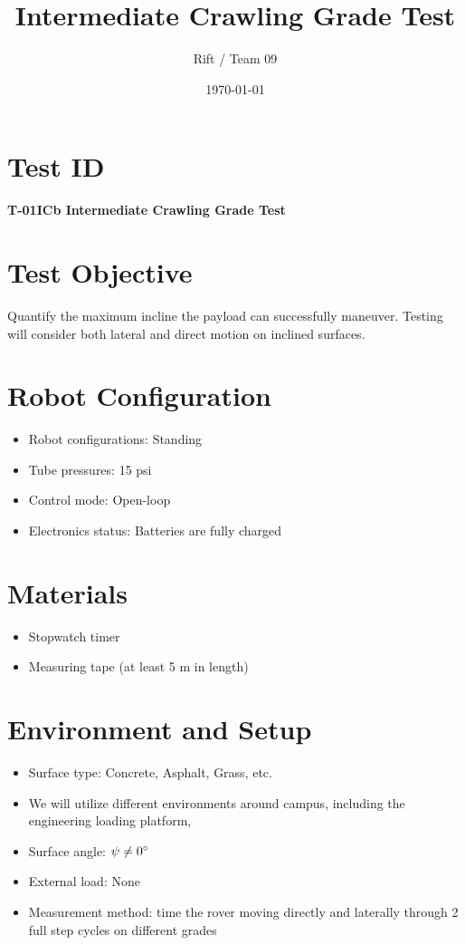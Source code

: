 \documentclass[11pt]{article}
\title{Intermediate Crawling Grade Test}
\author{Rift / Team 09}
\date{\today}
\begin{document}
\maketitle

\section*{Test ID}
\textbf{T-01ICb Intermediate Crawling Grade Test}

\section*{Test Objective}
Quantify the maximum incline the payload can successfully maneuver. Testing will consider both lateral and direct motion on inclined surfaces.

\section*{Robot Configuration}
\begin{itemize}[noitemsep]
    \item Robot configurations: Standing
    \item Tube pressures: 15 psi
    \item Control mode: Open-loop
    \item Electronics status: Batteries are fully charged
\end{itemize}

\section*{Materials}
\begin{itemize}[noitemsep]
    \item Stopwatch timer
    \item Measuring tape (at least 5 m in length)
    
\end{itemize}

\section*{Environment and Setup}
\begin{itemize}[noitemsep]
    \item Surface type: Concrete, Asphalt, Grass, etc.
    \item We will utilize different environments around campus, including the engineering loading platform, \underline{\hspace{5 cm}}
    \item Surface angle: $\psi \neq 0  {\degree}$ 
    \item External load: None
    \item Measurement method: time the rover moving directly and laterally through 2 full step cycles on different grades
\end{itemize}
\end{document}
